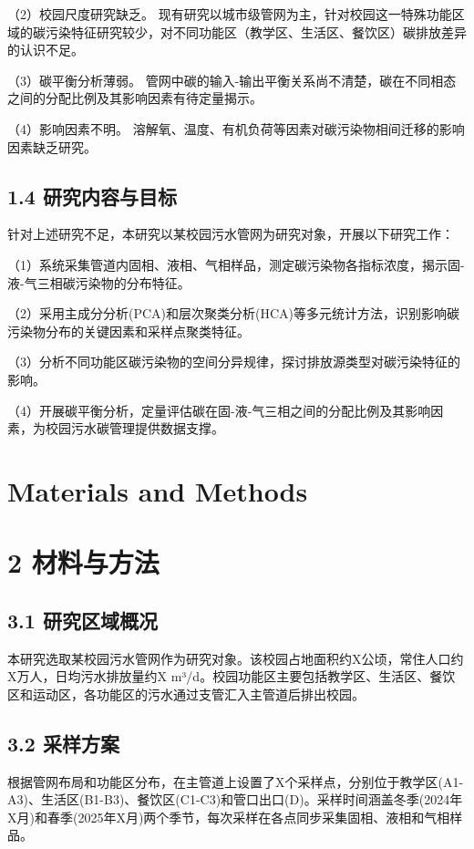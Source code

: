 \documentclass[12pt]{article}
\begin{document}
（2）校园尺度研究缺乏。 现有研究以城市级管网为主，针对校园这一特殊功能区域的碳污染特征研究较少，对不同功能区（教学区、生活区、餐饮区）碳排放差异的认识不足。

（3）碳平衡分析薄弱。 管网中碳的输入-输出平衡关系尚不清楚，碳在不同相态之间的分配比例及其影响因素有待定量揭示。

（4）影响因素不明。 溶解氧、温度、有机负荷等因素对碳污染物相间迁移的影响因素缺乏研究。

\subsection{1.4 研究内容与目标}

针对上述研究不足，本研究以某校园污水管网为研究对象，开展以下研究工作：

（1）系统采集管道内固相、液相、气相样品，测定碳污染物各指标浓度，揭示固-液-气三相碳污染物的分布特征。

（2）采用主成分分析(PCA)和层次聚类分析(HCA)等多元统计方法，识别影响碳污染物分布的关键因素和采样点聚类特征。

（3）分析不同功能区碳污染物的空间分异规律，探讨排放源类型对碳污染特征的影响。

（4）开展碳平衡分析，定量评估碳在固-液-气三相之间的分配比例及其影响因素，为校园污水碳管理提供数据支撑。

\section{Materials and Methods}
\label{sec:methods}

\section{2 材料与方法}

\subsection{3.1 研究区域概况}

本研究选取某校园污水管网作为研究对象。该校园占地面积约X公顷，常住人口约X万人，日均污水排放量约X m³/d。校园功能区主要包括教学区、生活区、餐饮区和运动区，各功能区的污水通过支管汇入主管道后排出校园。

\subsection{3.2 采样方案}

根据管网布局和功能区分布，在主管道上设置了X个采样点，分别位于教学区(A1-A3)、生活区(B1-B3)、餐饮区(C1-C3)和管口出口(D)。采样时间涵盖冬季(2024年X月)和春季(2025年X月)两个季节，每次采样在各点同步采集固相、液相和气相样品。
\end{document}
